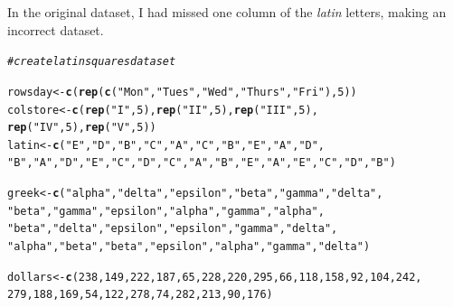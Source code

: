 \documentclass{article}\usepackage[]{graphicx}\usepackage[]{color}
\makeatletter
\newcommand{\hlnum}[1]{\textcolor[rgb]{0.686,0.059,0.569}{#1}}%
\newcommand{\hlstr}[1]{\textcolor[rgb]{0.192,0.494,0.8}{#1}}%
\newcommand{\hlcom}[1]{\textcolor[rgb]{0.678,0.584,0.686}{\textit{#1}}}%
\newcommand{\hlstd}[1]{\textcolor[rgb]{0.345,0.345,0.345}{#1}}%
\newcommand{\hlkwb}[1]{\textcolor[rgb]{0.69,0.353,0.396}{#1}}%
\newcommand{\hlkwd}[1]{\textcolor[rgb]{0.737,0.353,0.396}{\textbf{#1}}}%
\newenvironment{kframe}{%
 \def\at@end@of@kframe{}%
 \ifinner\ifhmode%
  \def\at@end@of@kframe{\end{minipage}}%
  \begin{minipage}{\columnwidth}%
 \fi\fi%
 \def\FrameCommand##1{\hskip\@totalleftmargin \hskip-\fboxsep
 \colorbox{shadecolor}{##1}\hskip-\fboxsep
     \hskip-\linewidth \hskip-\@totalleftmargin \hskip\columnwidth}%
 \MakeFramed {\advance\hsize-\width
   \@totalleftmargin\z@ \linewidth\hsize
   \@setminipage}}%
 {\par\unskip\endMakeFramed%
 \at@end@of@kframe}
\newenvironment{knitrout}{}{} %
\makeatother
\begin{document}
\begin{enumerate}
\begin{enumerate}
In the original dataset, I had missed one column of the {\it latin} letters, making an incorrect dataset.

\begin{knitrout}\footnotesize
{}\color{fgcolor}\begin{kframe}
\begin{alltt}
\hlcom{# create latin squares data set}

\hlstd{rowsday} \hlkwb{<-} \hlkwd{c}\hlstd{(}\hlkwd{rep}\hlstd{(}\hlkwd{c}\hlstd{(}\hlstr{"Mon"}\hlstd{,} \hlstr{"Tues"}\hlstd{,} \hlstr{"Wed"}\hlstd{,} \hlstr{"Thurs"}\hlstd{,} \hlstr{"Fri"}\hlstd{),}\hlnum{5}\hlstd{))}
\hlstd{colstore} \hlkwb{<-} \hlkwd{c}\hlstd{(}\hlkwd{rep}\hlstd{(}\hlstr{"I"}\hlstd{,} \hlnum{5}\hlstd{),} \hlkwd{rep}\hlstd{(}\hlstr{"II"}\hlstd{,} \hlnum{5}\hlstd{),} \hlkwd{rep}\hlstd{(}\hlstr{"III"}\hlstd{,} \hlnum{5}\hlstd{),}
              \hlkwd{rep}\hlstd{(}\hlstr{"IV"}\hlstd{,} \hlnum{5}\hlstd{),} \hlkwd{rep}\hlstd{(}\hlstr{"V"}\hlstd{,} \hlnum{5}\hlstd{))}
\hlstd{latin} \hlkwb{<-} \hlkwd{c}\hlstd{(}\hlstr{"E"}\hlstd{,} \hlstr{"D"}\hlstd{,} \hlstr{"B"}\hlstd{,} \hlstr{"C"}\hlstd{,} \hlstr{"A"}\hlstd{,} \hlstr{"C"}\hlstd{,} \hlstr{"B"}\hlstd{,} \hlstr{"E"}\hlstd{,} \hlstr{"A"}\hlstd{,} \hlstr{"D"}\hlstd{,}
           \hlstr{"B"}\hlstd{,} \hlstr{"A"}\hlstd{,} \hlstr{"D"}\hlstd{,} \hlstr{"E"}\hlstd{,} \hlstr{"C"}\hlstd{,}\hlstr{"D"}\hlstd{,} \hlstr{"C"}\hlstd{,} \hlstr{"A"}\hlstd{,} \hlstr{"B"}\hlstd{,} \hlstr{"E"}\hlstd{,} \hlstr{"A"}\hlstd{,} \hlstr{"E"}\hlstd{,} \hlstr{"C"}\hlstd{,} \hlstr{"D"}\hlstd{,} \hlstr{"B"}\hlstd{)}

\hlstd{greek} \hlkwb{<-} \hlkwd{c}\hlstd{(}\hlstr{"alpha"}\hlstd{,} \hlstr{"delta"}\hlstd{,} \hlstr{"epsilon"}\hlstd{,} \hlstr{"beta"}\hlstd{,} \hlstr{"gamma"}\hlstd{,} \hlstr{"delta"}\hlstd{,}
           \hlstr{"beta"}\hlstd{,} \hlstr{"gamma"}\hlstd{,} \hlstr{"epsilon"}\hlstd{,} \hlstr{"alpha"}\hlstd{,} \hlstr{"gamma"}\hlstd{,} \hlstr{"alpha"}\hlstd{,}
           \hlstr{"beta"}\hlstd{,} \hlstr{"delta"}\hlstd{,} \hlstr{"epsilon"}\hlstd{,} \hlstr{"epsilon"}\hlstd{,} \hlstr{"gamma"}\hlstd{,} \hlstr{"delta"}\hlstd{,}
           \hlstr{"alpha"}\hlstd{,} \hlstr{"beta"}\hlstd{,} \hlstr{"beta"}\hlstd{,} \hlstr{"epsilon"}\hlstd{,} \hlstr{"alpha"}\hlstd{,} \hlstr{"gamma"}\hlstd{,} \hlstr{"delta"}\hlstd{)}

\hlstd{dollars} \hlkwb{<-} \hlkwd{c}\hlstd{(}\hlnum{238}\hlstd{,}\hlnum{149}\hlstd{,}\hlnum{222}\hlstd{,}\hlnum{187}\hlstd{,}\hlnum{65}\hlstd{,}\hlnum{228}\hlstd{,}\hlnum{220}\hlstd{,}\hlnum{295}\hlstd{,}\hlnum{66}\hlstd{,}\hlnum{118}\hlstd{,}\hlnum{158}\hlstd{,}\hlnum{92}\hlstd{,}\hlnum{104}\hlstd{,}\hlnum{242}\hlstd{,}
             \hlnum{279}\hlstd{,}\hlnum{188}\hlstd{,}\hlnum{169}\hlstd{,}\hlnum{54}\hlstd{,}\hlnum{122}\hlstd{,}\hlnum{278}\hlstd{,}\hlnum{74}\hlstd{,}\hlnum{282}\hlstd{,}\hlnum{213}\hlstd{,}\hlnum{90}\hlstd{,}\hlnum{176}\hlstd{)}


\end{alltt}
\end{kframe}
\end{knitrout}
\end{enumerate}
\end{enumerate}
\end{document}

